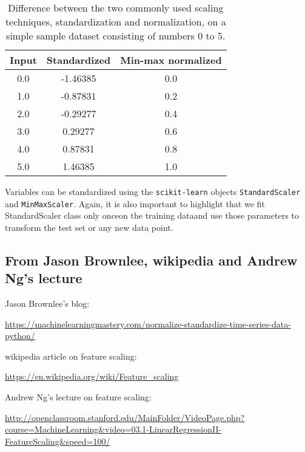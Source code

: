 \documentclass[11pt]{article}
\begin{document}
    \begin{table}[h!]
        \centering
        \begin{tabular}{||c | c | c||}
            \hline
            Input & Standardized & Min-max normalized \\
            \hline
            0.0 & -1.46385 & 0.0 \\
            1.0 & -0.87831 & 0.2 \\
            2.0 & -0.29277 & 0.4 \\
            3.0 & 0.29277 & 0.6 \\
            4.0 & 0.87831 & 0.8 \\
            5.0 & 1.46385 & 1.0 \\
            \hline
        \end{tabular}
        \caption{Difference between the two commonly used scaling techniques, standardization and normalization, on a simple sample dataset consisting of numbers 0 to 5.}
        \label{tab:standardization_vs_normalization}

    \end{table}

    Variables can be standardized using the \texttt{scikit-learn} objects \texttt{StandardScaler} and \texttt{MinMaxScaler}.
    Again, it is also important to highlight that we fit StandardScaler class only once\textemdash on the training data\textemdash and use those parameters to transform the test set or any new data point.

    \subsection{From Jason Brownlee\cite{Brownlee2013}, wikipedia and Andrew Ng's lecture} \label{subsec:feature_scaling_brownlee}

    Jason Brownlee's blog:

    \url{https://machinelearningmastery.com/normalize-standardize-time-series-data-python/}

    wikipedia article on feature scaling:

    \url{https://en.wikipedia.org/wiki/Feature_scaling}

    Andrew Ng's lecture on feature scaling:

    \url{http://openclassroom.stanford.edu/MainFolder/VideoPage.php?course=MachineLearning&video=03.1-LinearRegressionII-FeatureScaling&speed=100/}

    \vspace{5mm}
\end{document}
